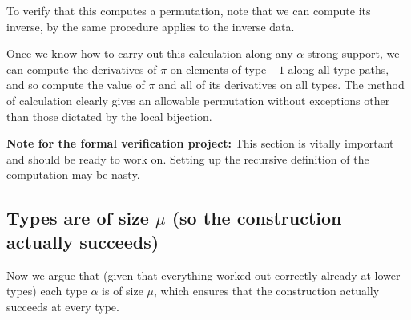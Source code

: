 \documentclass[112pt]{article}
\begin{document}
\begin{description}
To verify that this computes a permutation, note that we can compute its inverse, by the same procedure applies to the inverse data.

Once we know how to carry out this calculation along any $\alpha$-strong support, we can compute the derivatives of $\pi$ on elements of type $-1$  along all type paths, and so compute the value of $\pi$ and all of its derivatives on all types.  The method of calculation clearly gives an allowable permutation without exceptions other than those dictated by the local bijection.

\end{description}
{\bf Note for the formal verification project:}  This section is vitally important and should be ready to work on.  Setting up the recursive definition of the computation may be nasty.

\newpage
\subsection{Types are of size $\mu$ (so the construction actually succeeds)}

Now we argue that (given that everything worked out correctly already at lower types) each type $\alpha$ is of size $\mu$, which ensures
that the construction actually succeeds at every type.
\end{document}
